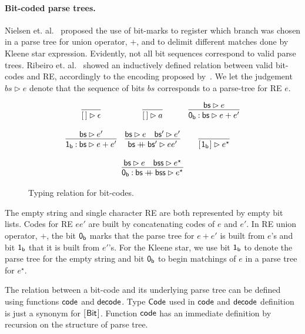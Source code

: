 \documentclass[sigplan]{acmart}
\newcommand{\plus}{\mathbin{+\!\!\!+}}
\theoremstyle{definition}
\newcommand{\D}[1]{\blue{\mathsf{#1}}}
\newcommand{\C}[1]{\red{\mathsf{#1}}}
\newcommand{\F}[1]{\green{\mathsf{#1}}}
\newcommand{\V}[1]{\black{\mathsf{#1}}}
\begin{document}
\paragraph{Bit-coded parse trees.} Nielsen et. al.~\cite{Lasse2011} proposed the
use of bit-marks to register which branch was chosen in a parse tree for union
operator, $+$, and to delimit different matches done by Kleene star expression.
Evidently, not all bit sequences correspond to valid parse trees. Ribeiro et. al.~\cite{Ribeiro2017}
showed an inductively defined relation between valid bit-codes and RE, accordingly to the encoding
proposed by~\cite{Lasse2011}. We let the judgement $bs \rhd e$ denote that the sequence of bits
$bs$ corresponds to a parse-tree for RE $e$.


\begin{figure}[h]
  \[
     \begin{array}{ccc}
        \infer{\ensuremath{[\mskip1.5mu \mskip1.5mu]} \rhd \epsilon}{} &
        \infer{\ensuremath{[\mskip1.5mu \mskip1.5mu]} \rhd a}{}  &
        \infer{\ensuremath{\C{0_b}\mathbin{:}\V{bs}} \rhd e + e'}{\ensuremath{\V{bs}} \rhd e} \\ \\
        \infer{\ensuremath{\C{1_b}\mathbin{:}\V{bs}} \rhd e + e'}{\ensuremath{\V{bs}} \rhd e'} &
        \infer{\ensuremath{\V{bs}\plus \V{bs'}} \rhd e e'}{\ensuremath{\V{bs}} \rhd e & \ensuremath{\V{bs'}} \rhd e'} &
        \infer{\ensuremath{[\mskip1.5mu \C{1_b}\mskip1.5mu]} \rhd e^\star}{} \\ \\
        \multicolumn{3}{c}{
           \infer{\ensuremath{\C{0_b}\mathbin{:}\V{bs}\plus \V{bss}} \rhd e^\star}{\ensuremath{\V{bs}} \rhd e & \ensuremath{\V{bss}} \rhd e^\star}
        }
     \end{array}
  \]
  \centering
  \caption{Typing relation for bit-codes.}
  \label{figure:typing-bitcodes}
\end{figure}

The empty string and single character RE are both represented by empty bit lists. Codes for RE $ee'$ are
built by concatenating codes of $e$ and $e'$. In RE union operator, $+$, the bit \ensuremath{\C{0_b}} marks that the
parse tree for $e + e'$  is built from $e$'s and bit \ensuremath{\C{1_b}} that it is built from $e'$'s. For the Kleene
star, we use bit \ensuremath{\C{1_b}} to denote the parse tree for the empty string and bit \ensuremath{\C{0_b}} to begin matchings of $e$
in a parse tree for $e^\star$.


The relation between a bit-code and its underlying parse tree can be defined using functions
\ensuremath{\F{code}} and \ensuremath{\F{decode}}. Type \ensuremath{\D{Code}} used in \ensuremath{\F{code}} and \ensuremath{\F{decode}} definition is just a synonym
for \ensuremath{[\mskip1.5mu \D{Bit}\mskip1.5mu]}. Function \ensuremath{\F{code}} has an immediate definition by recursion on the structure of parse tree.
\end{document}
